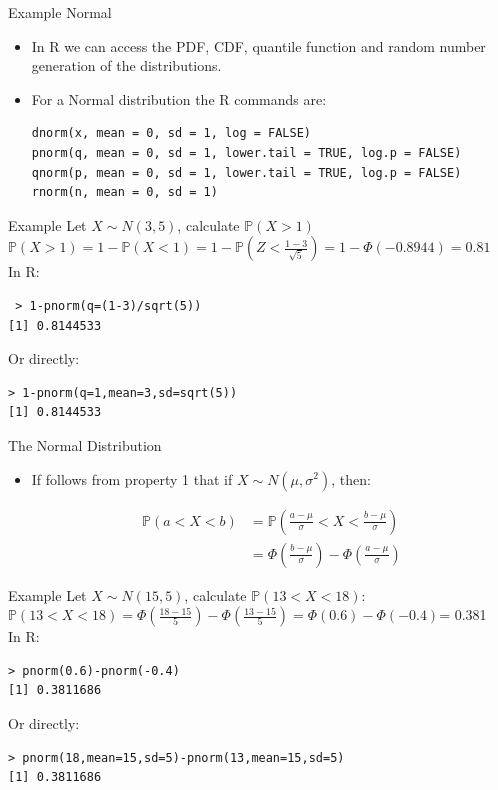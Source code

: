\documentclass[handout]{beamer}
\begin{document}
\begin{frame}[fragile]{Example Normal}
\scriptsize{
\begin{itemize}
 \item In R we can access the PDF, CDF, quantile function and random number generation of the distributions.
 \item For a Normal distribution the R commands are:
\begin{verbatim}
dnorm(x, mean = 0, sd = 1, log = FALSE)
pnorm(q, mean = 0, sd = 1, lower.tail = TRUE, log.p = FALSE)
qnorm(p, mean = 0, sd = 1, lower.tail = TRUE, log.p = FALSE)
rnorm(n, mean = 0, sd = 1) 
\end{verbatim}
 
\end{itemize}

\begin{block}{Example}
Let $X\sim N(3,5)$, calculate $\mathbb{P}(X > 1)$ \\
$\mathbb{P}(X >1) = 1-\mathbb{P}(X<1) = 1-\mathbb{P}(Z < \frac{1-3}{\sqrt{5}})=1-\Phi(-0.8944)= 0.81$ \\
In R:
\begin{verbatim}
 > 1-pnorm(q=(1-3)/sqrt(5))
[1] 0.8144533
\end{verbatim}
Or directly:
\begin{verbatim}
> 1-pnorm(q=1,mean=3,sd=sqrt(5))
[1] 0.8144533 
\end{verbatim}
\end{block}
}
\end{frame}



\begin{frame}[fragile]{The  Normal Distribution}

\scriptsize{
\begin{itemize}
 \item If follows from property 1 that if $X\sim N(\mu,\sigma^2)$, then:
 
 \begin{align}
  \mathbb{P}(a<X<b) & = \mathbb{P}\left(\frac{a-\mu}{\sigma}<X<\frac{b-\mu}{\sigma}\right) \\
   & = \Phi \left(\frac{b-\mu}{\sigma}\right)-\Phi \left(\frac{a-\mu}{\sigma}\right)
 \end{align}

 
\end{itemize}

\begin{block}{Example}
Let $X\sim N(15,5)$, calculate $\mathbb{P}(13<X<18)$: \\
$\mathbb{P}(13<X<18)=\Phi \left(\frac{18-15}{5}\right)-\Phi \left(\frac{13-15}{5}\right)=\Phi(0.6)-\Phi(-0.4)$= 0.381\\
In R:
\begin{verbatim}
> pnorm(0.6)-pnorm(-0.4)
[1] 0.3811686
\end{verbatim}
Or directly:
\begin{verbatim}
> pnorm(18,mean=15,sd=5)-pnorm(13,mean=15,sd=5)
[1] 0.3811686
\end{verbatim}
\end{block}


}
\end{frame}
\end{document}

